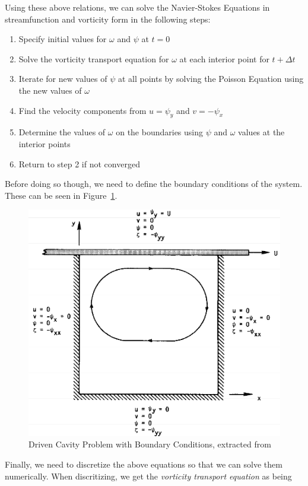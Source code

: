 \documentclass[addpoints]{exam}
\begin{document}
\begin{questions}
\begin{solution}
Using these above relations, we can solve the Navier-Stokes Equations in streamfunction and vorticity form in the following steps:

\begin{enumerate}
\item Specify initial values for $\omega$ and $\psi$ at $t=0$
\item Solve the vorticity transport equation for $\omega$ at each interior point for $t + \Delta t$
\item Iterate for new values of $\psi$ at all points by solving the Poisson Equation using the new values of $\omega$
\item Find the velocity components from $u = \psi_{y}$ and $v = -\psi_{x}$
\item Determine the values of $\omega$ on the boundaries using $\psi$ and $\omega$ values at the interior points
\item Return to step 2 if not converged
\end{enumerate}

Before doing so though, we need to define the boundary conditions of the system. These can be seen in Figure~\ref{fig:boxbc}.

\begin{figure}[H]
\centering
\includegraphics[width=.5\textwidth]{box_bc.png}
\caption{Driven Cavity Problem with Boundary Conditions, extracted from \cite{box}}
\label{fig:boxbc}
\end{figure}

Finally, we need to discretize the above equations so that we can solve them numerically. When discritizing, we get the {\em vorticity transport equation} as being


\end{solution}
\end{questions}
\end{document}
